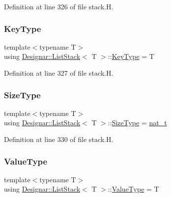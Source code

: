 Definition at line 326 of file stack.\+H.

\mbox{\label{class_designar_1_1_list_stack_adf88da10e96a685fa2cdd3fff029d52c}} 
\subsubsection{\texorpdfstring{Key\+Type}{KeyType}}
{\footnotesize\ttfamily template$<$typename T$>$ \\
using \hyperlink{class_designar_1_1_list_stack}{Designar\+::\+List\+Stack}$<$ T $>$\+::\hyperlink{class_designar_1_1_s_l_list_a0f9ac3eaee2d1a9e6091aaaac825ccb2}{Key\+Type} =  T}



Definition at line 327 of file stack.\+H.

\mbox{\label{class_designar_1_1_list_stack_ae1849f2d4064bd8602122eb9db436441}} 
\subsubsection{\texorpdfstring{Size\+Type}{SizeType}}
{\footnotesize\ttfamily template$<$typename T$>$ \\
using \hyperlink{class_designar_1_1_list_stack}{Designar\+::\+List\+Stack}$<$ T $>$\+::\hyperlink{class_designar_1_1_s_l_list_a253792b5e9c19ea61fb49e5e83f6159b}{Size\+Type} =  \hyperlink{namespace_designar_aa72662848b9f4815e7bf31a7cf3e33d1}{nat\+\_\+t}}



Definition at line 330 of file stack.\+H.

\mbox{\label{class_designar_1_1_list_stack_ac51dd165958a3e9ff0790e9f5791a4a5}} 
\subsubsection{\texorpdfstring{Value\+Type}{ValueType}}
{\footnotesize\ttfamily template$<$typename T$>$ \\
using \hyperlink{class_designar_1_1_list_stack}{Designar\+::\+List\+Stack}$<$ T $>$\+::\hyperlink{class_designar_1_1_s_l_list_a22813e78b0dea3a55f47d5f476fd99a1}{Value\+Type} =  T}



